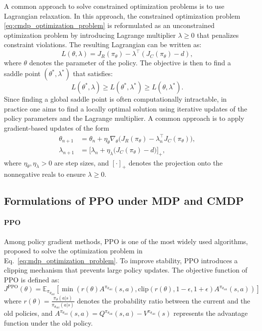 A common approach to solve constrained optimization problems is to use Lagrangian relaxation.
In this approach, the constrained optimization problem \eqref{eq:cmdp_optimization_problem} is reformulated as an unconstrained optimization problem by introducing Lagrange multiplier $\lambda \geq 0$ that penalizes constraint violations.
The resulting Lagrangian can be written as:
\begin{equation}
    L(\theta, \lambda) = J_R(\pi_\theta) - \lambda^\top (J_C(\pi_\theta) - d),
\end{equation}
where $\theta$ denotes the parameter of the policy.
The objective is then to find a saddle point $(\theta^*, \lambda^*)$ that satisfies:
\begin{equation}
    L(\theta^*, \lambda) \geq L(\theta^*, \lambda^*) \geq L(\theta, \lambda^*).
\end{equation}
Since finding a global saddle point is often computationally intractable, in practice one aims to find a locally optimal solution using iterative updates of the policy parameters and the Lagrange multiplier. 
A common approach is to apply gradient-based updates of the form
\begin{align}
    \theta_{n+1} &= \theta_n + \eta_\theta \nabla_\theta \Big(J_R(\pi_\theta) - \lambda_n^\top J_C(\pi_\theta)\Big), \\
    \lambda_{n+1} &= \Big[ \lambda_n + \eta_\lambda \big( J_C(\pi_\theta) - d \big) \Big]_+,
\end{align}
where $\eta_\theta, \eta_\lambda > 0$ are step sizes, and $[\cdot]_+$ denotes the projection onto the nonnegative reals to ensure $\lambda \geq 0$.


\subsection{Formulations of PPO under MDP and CMDP}

\paragraph{PPO}

Among policy gradient methods, PPO is one of the most widely used algorithms, proposed to solve the optimization problem in Eq.~\ref{eq:mdp_optimization_problem}.
To improve stability, PPO introduces a clipping mechanism that prevents large policy updates.
The objective function of PPO is defined as:
\begin{equation} \label{eq:ppo_objective}
    J^{\text{PPO}}(\theta) = \mathbb{E}_{\pi_{\theta_\text{old}}} \left[ \min \left( r(\theta) A^{\pi_{\theta_\text{old}}}(s, a), \text{clip}(r(\theta), 1 - \epsilon, 1 + \epsilon) A^{\pi_{\theta_\text{old}}}(s, a) \right) \right]
\end{equation}
where $r(\theta) = \frac{\pi_\theta(a|s)}{\pi_{\theta_\text{old}}(a|s)}$ denotes the probability ratio between the current and the old policies, and $A^{\pi_{\theta_\text{old}}}(s, a) = Q^{\pi_{\theta_\text{old}}}(s, a) - V^{\pi_{\theta_\text{old}}}(s)$ represents the advantage function under the old policy.

